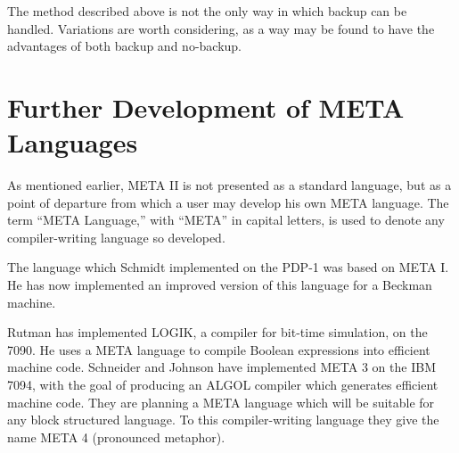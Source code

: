 \documentclass[notitlepage,twocolumn]{report}
\begin{document}
The method described above is not the only way in which backup can be
handled. Variations are worth considering, as a way may be found to
have the advantages of both backup and no-backup.


\section*{Further Development of META Languages}

As mentioned earlier, META II is not presented as a standard language,
but as a point of departure from which a user may develop his own META
language. The term ``META Language,'' with ``META'' in capital
letters, is used to denote any compiler-writing language so developed.

The language which Schmidt implemented on the PDP-1 was
based on META I. He has now implemented an improved version of this
language for a Beckman machine.

Rutman has implemented LOGIK, a compiler for bit-time
simulation, on the 7090. He uses a META language to compile Boolean
expressions into efficient machine code. Schneider and
Johnson have implemented META 3 on the IBM 7094, with
the goal of producing an ALGOL compiler which generates efficient
machine code. They are planning a META language which will be suitable
for any block structured language. To this compiler-writing language
they give the name META 4 (pronounced metaphor).


\theendnotes

\onecolumn
\end{document}
